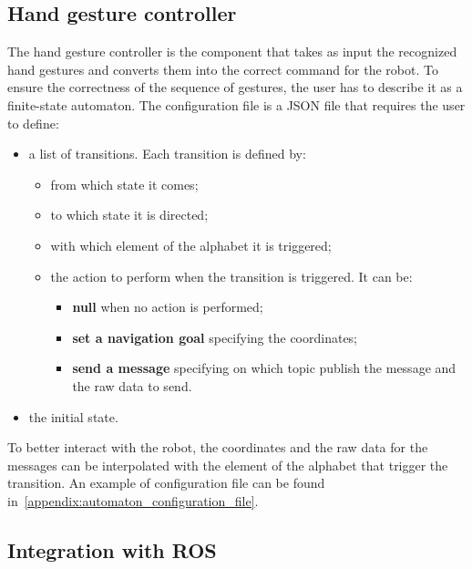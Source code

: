 \documentclass[../thesis.tex]{subfiles}
\begin{document}
\subsection{Hand gesture controller}\label{ss:hand_gesture_controller}
The hand gesture controller is the component that takes as input the recognized hand gestures and converts them into the correct command for the robot. To ensure the correctness of the sequence of gestures, the user has to describe it as a finite-state automaton. The configuration file is a JSON file that requires the user to define:
\begin{itemize}
    \item a list of transitions. Each transition is defined by:
    \begin{itemize}
        \item from which state it comes;
        \item to which state it is directed;
        \item with which element of the alphabet it is triggered;
        \item the action to perform when the transition is triggered. It can be:
        \begin{itemize}
            \item \textbf{null} when no action is performed;
            \item \textbf{set a navigation goal} specifying the coordinates;
            \item \textbf{send a message} specifying on which topic publish the message and the raw data to send.
        \end{itemize}
    \end{itemize}
    \item the initial state.
\end{itemize}
To better interact with the robot, the coordinates and the raw data for the messages can be interpolated with the element of the alphabet that trigger the transition. An example of configuration file can be found in~\ref{appendix:automaton_configuration_file}.

\subsection{Integration with ROS}
\end{document}
